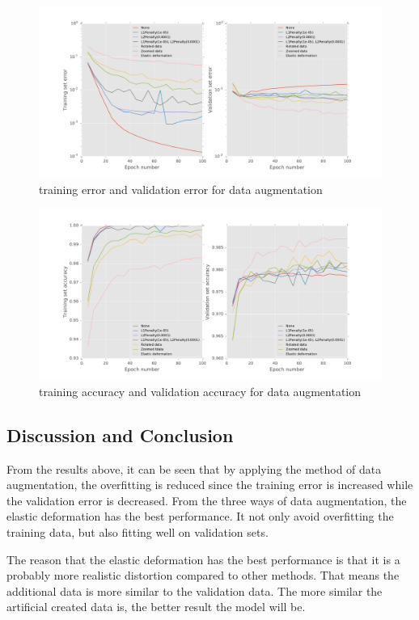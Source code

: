 \documentclass[11pt]{article}
\begin{document}
\begin{figure}[htp]
\centering 
  \includegraphics[width=1\textwidth]{error_aug.pdf}
  \caption{training error and validation error for data augmentation}
  \label{fig:aug_error}
\end{figure}

\begin{figure}[htp]
\centering 
  \includegraphics[width=1\textwidth]{acc_aug.pdf}
  \caption{training accuracy and validation accuracy for data augmentation}
  \label{fig:aug_error}
\end{figure}

\subsection{Discussion and Conclusion}
From the results above, it can be seen that by applying the method of  data augmentation, the overfitting is reduced since the training error is increased while the validation error is decreased. From the three ways of data augmentation, the elastic deformation has the best performance. It not only avoid overfitting the training data, but also fitting well on validation sets. 

The reason that the elastic deformation has the best performance is that it is a probably more realistic distortion compared to other methods. That means the additional data is more similar to the validation data. The more similar the artificial created data is, the better result the model will be.
\end{document}
